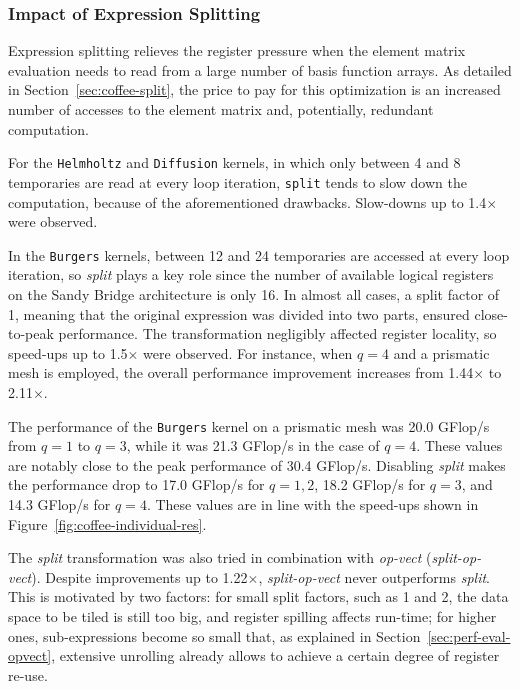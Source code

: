 \subsubsection{Impact of Expression Splitting}
\label{sec:perf-results-split} 
Expression splitting relieves the register pressure when the element matrix evaluation needs to read from a large number of basis function arrays. As detailed in Section~\ref{sec:coffee-split}, the price to pay for this optimization is an increased number of accesses to the element matrix and, potentially, redundant computation. 

For the {\tt Helmholtz} and {\tt Diffusion} kernels, in which only between 4 and 8 temporaries are read at every loop iteration, \texttt{split} tends to slow down the computation, because of the aforementioned drawbacks. Slow-downs up to 1.4$\times$ were observed. 

In the {\tt Burgers} kernels, between 12 and 24 temporaries are accessed at every loop iteration, so \emph{split} plays a key role since the number of available logical registers on the Sandy Bridge architecture is only 16. In almost all cases, a split factor of 1, meaning that the original expression was divided into two parts, ensured close-to-peak performance. The transformation negligibly affected register locality, so speed-ups up to 1.5$\times$ were observed. For instance, when $q=4$ and a prismatic mesh is employed, the overall performance improvement increases from 1.44$\times$ to 2.11$\times$. 

The performance of the {\tt Burgers} kernel on a prismatic mesh was 20.0 GFlop/s from $q=1$ to $q=3$, while it was 21.3 GFlop/s in the case of $q=4$. These values are notably close to the peak performance of 30.4 GFlop/s. Disabling \emph{split} makes the performance drop to 17.0 GFlop/s for $q=1, 2$, 18.2 GFlop/s for $q=3$, and 14.3 GFlop/s for $q=4$. These values are in line with the speed-ups shown in Figure~\ref{fig:coffee-individual-res}.

The \emph{split} transformation was also tried in combination with \emph{op-vect} (\emph{split-op-vect}). Despite improvements up to 1.22$\times$, \emph{split-op-vect} never outperforms \emph{split}. This is motivated by two factors: for small split factors, such as 1 and 2, the data space to be tiled is still too big, and register spilling affects run-time; for higher ones, sub-expressions become so small that, as explained in Section~\ref{sec:perf-eval-opvect}, extensive unrolling already allows to achieve a certain degree of register re-use.

